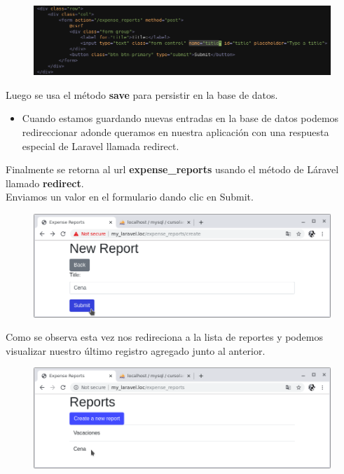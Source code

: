 \documentclass{article}
\begin{document}
\begin{figure}[h!]
  \centering
  \includegraphics[scale=0.75]{./Pictures/066_name_title.png}
\end{figure}

Luego se usa el método \textbf{save} para persistir en la base de datos.

\begin{itemize}
  \item Cuando estamos guardando nuevas entradas en la base de datos podemos
    redireccionar adonde queramos en nuestra aplicación con una respuesta
    especial de Laravel llamada redirect.
\end{itemize}

Finalmente se retorna al url \textbf{expense\_reports} usando el método de
Láravel llamado \textbf{redirect}.\\

Enviamos un valor en el formulario dando clic en Submit.

\newpage

\begin{figure}[h!]
  \centering
  \includegraphics[scale=0.5]{./Pictures/064_submit_cena.png}
\end{figure}

Como se observa esta vez nos redireciona a la lista de reportes y podemos
visualizar nuestro último registro agregado junto al anterior.\\

\begin{figure}[h!]
  \centering
  \includegraphics[scale=0.5]{./Pictures/065_store_ok.png}
\end{figure}
\end{document}
